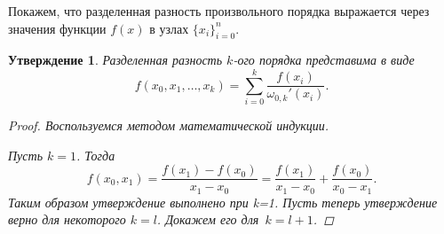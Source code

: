 \documentclass[11pt,a4paper,twoside]{report}
\numberwithin{equation}{section}
\newtheorem*{statement}{Утверждение}
\theoremstyle{definition}
\theoremstyle{plain}
\begin{document}
Покажем, что разделенная разность произвольного порядка выражается
через значения функции $f(x)$ в узлах $\{x_i\}_{i=0}^n$.
%
\begin{statement}
%
    Разделенная разность $k$-ого порядка представима в виде
    \begin{equation}
        \label{distr_subtr}
        f(x_0, x_{1}, \ldots, x_{k})=\sum_{i=0}^{k}{\frac{f(x_i)}
        {\omega_{0,k}'(x_i)}}.
    \end{equation}
    \begin{proof}
        Воспользуемся методом математической индукции.

        \noindent
        Пусть $k = 1$. Тогда
        $$
            f(x_0, x_1)=\frac{f(x_1)-f(x_0)}{x_1-x_0}=\frac{f(x_1)}{x_1-x_0}+
            \frac{f(x_0)}{x_0-x_1}.
        $$
        Таким образом утверждение выполнено при k=1. Пусть теперь
        утверждение верно для некоторого $k=l$. Докажем его для~$k=l+1$.


\end{proof}
\end{statement}
\end{document}
